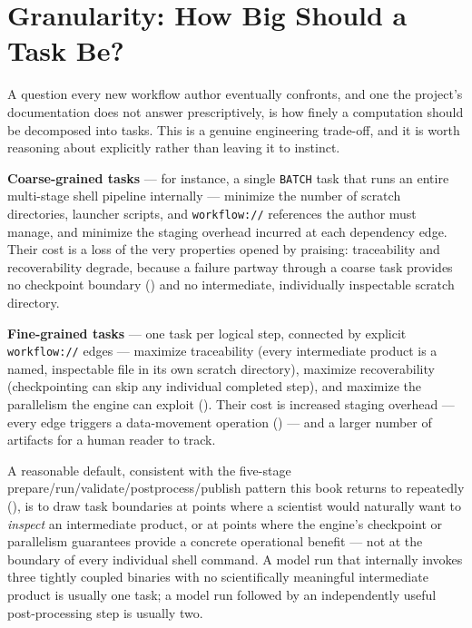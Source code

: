 \section{Granularity: How Big Should a Task Be?}
\label{sec:task-granularity}

A question every new workflow author eventually confronts, and one the
project's documentation does not answer prescriptively, is how finely a
computation should be decomposed into tasks. This is a genuine engineering
trade-off, and it is worth reasoning about explicitly rather than leaving it
to instinct.

\textbf{Coarse-grained tasks} --- for instance, a single \texttt{BATCH} task
that runs an entire multi-stage shell pipeline internally --- minimize the
number of scratch directories, launcher scripts, and \texttt{workflow://}
references the author must manage, and minimize the staging overhead
incurred at each dependency edge. Their cost is a loss of the very
properties  opened by praising: traceability and
recoverability degrade, because a failure partway through a coarse task
provides no checkpoint boundary () and no
intermediate, individually inspectable scratch directory.

\textbf{Fine-grained tasks} --- one task per logical step, connected by
explicit \texttt{workflow://} edges --- maximize traceability (every
intermediate product is a named, inspectable file in its own scratch
directory), maximize recoverability (checkpointing can skip any individual
completed step), and maximize the parallelism the engine can exploit
(). Their cost is increased staging overhead
--- every edge triggers a data-movement operation
() --- and a larger number of artifacts
for a human reader to track.

\begin{practicebox}
A reasonable default, consistent with the five-stage
prepare/run/validate/postprocess/publish pattern this book returns to
repeatedly (), is to draw task boundaries at
points where a scientist would naturally want to \emph{inspect} an
intermediate product, or at points where the engine's checkpoint or
parallelism guarantees provide a concrete operational benefit --- not at the
boundary of every individual shell command. A model run that internally
invokes three tightly coupled binaries with no scientifically meaningful
intermediate product is usually one task; a model run followed by an
independently useful post-processing step is usually two.
\end{practicebox}

